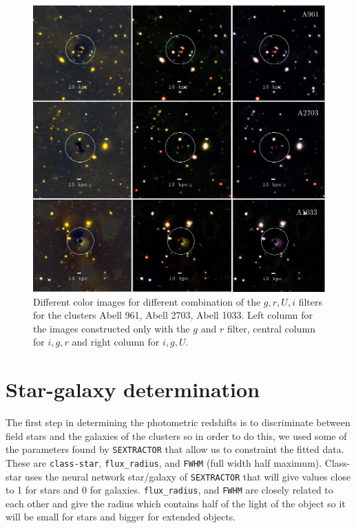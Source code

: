 \begin{figure}[H]
\centering
\includegraphics[width=15cm]{images/full_small.jpg}
\caption[Color images for various clusters]{Different color images for different combination of the $g,r,U,i$ filters for the clusters Abell 961, Abell 2703, Abell 1033. Left column for the images constructed only with the $g$ and $r$ filter, central column for $i,g,r$ and right column for $i,g,U$.}
\end{figure}

\section{Star-galaxy determination}

The first step in determining the photometric redshifts is to discriminate between field stars and the galaxies of the clusters so in order to do this, we used some of the parameters found by \texttt{SEXTRACTOR} that allow us to constraint the fitted data. These are \texttt{class-star}, \texttt{flux\_radius}, and \texttt{FWHM} (full width half maximum). Class-star uses the neural network star/galaxy of \texttt{SEXTRACTOR} that will give values close to 1 for stars and 0 for galaxies. \texttt{flux\_radius}, and \texttt{FWHM} are closely related to each other and give the radius which contains half of the light of the object so it will be small for stars and bigger for extended objects.

